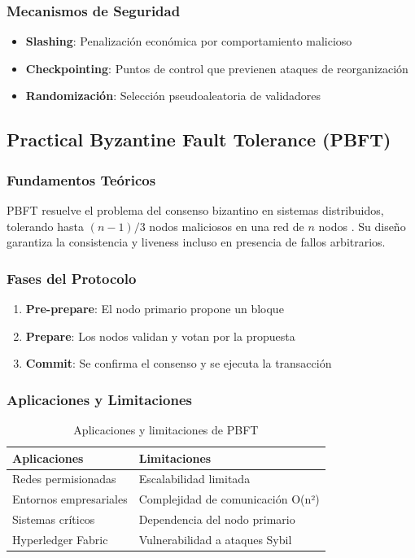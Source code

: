 \documentclass[spanish,12pt,letterpaper]{report}
\begin{document}
\subsubsection{Mecanismos de Seguridad}

\begin{itemize}
    \item \textbf{Slashing}: Penalización económica por comportamiento malicioso
    \item \textbf{Checkpointing}: Puntos de control que previenen ataques de reorganización
    \item \textbf{Randomización}: Selección pseudoaleatoria de validadores
\end{itemize}

\subsection{Practical Byzantine Fault Tolerance (PBFT)}

\subsubsection{Fundamentos Teóricos}

PBFT resuelve el problema del consenso bizantino en sistemas distribuidos, tolerando hasta $(n-1)/3$ nodos maliciosos en una red de $n$ nodos \cite{castro1999practical}. Su diseño garantiza la consistencia y liveness incluso en presencia de fallos arbitrarios.

\subsubsection{Fases del Protocolo}

\begin{enumerate}
    \item \textbf{Pre-prepare}: El nodo primario propone un bloque
    \item \textbf{Prepare}: Los nodos validan y votan por la propuesta
    \item \textbf{Commit}: Se confirma el consenso y se ejecuta la transacción
\end{enumerate}

\subsubsection{Aplicaciones y Limitaciones}

\begin{table}[h]
\centering
\begin{tabular}{|p{6cm}|p{6cm}|}
\hline
\textbf{Aplicaciones} & \textbf{Limitaciones} \\
\hline
Redes permisionadas & Escalabilidad limitada \\
Entornos empresariales & Complejidad de comunicación O(n²) \\
Sistemas críticos & Dependencia del nodo primario \\
Hyperledger Fabric & Vulnerabilidad a ataques Sybil \\
\hline
\end{tabular}
\caption{Aplicaciones y limitaciones de PBFT}
\label{tab:pbft-comparison}
\end{table}
\end{document}
